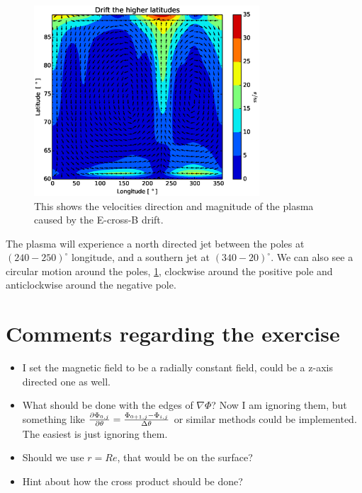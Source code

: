 \documentclass[x11names]{article}
\begin{document}
    \begin{figure}
      \centering
      \includegraphics[width = 0.75\textwidth]{../source/vArrows}
      \caption{This shows the velocities direction and magnitude of the plasma caused by the E-cross-B drift. }
      \label{fig:velocity}
    \end{figure}

    The plasma will experience a north directed jet between the poles at \((240-250) ^\circ\) longitude, and a southern jet at \((340- 20) ^\circ\). We can also see a circular motion around the poles, \cref{fig:velocity}, clockwise around the positive pole and anticlockwise around the negative pole.




\appendix
\section{Comments regarding the exercise}
    \begin{itemize}
      \item I set the magnetic field to be a radially constant field, could be a z-axis directed one as well.
      \item What should be done with the edges of \(\nabla \Phi\)? Now I am ignoring them, but something like \( \pdv{\Phi_{0,j}}{\theta} = \frac{ \Phi_{0+1, j} - \Phi_{i, j} }{\Delta \theta}\) or similar methods could be implemented. The easiest is just ignoring them.
      \item Should we use \(r = Re\), that would be on the surface?
      \item Hint about how the cross product should be done? 
    \end{itemize}
\end{document}
